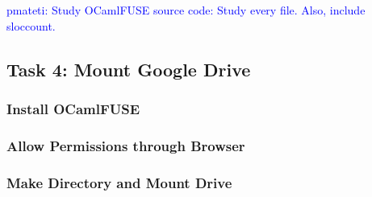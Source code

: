 \documentclass{article}
\newcommand{\PM}[1]{\textcolor{Blue}{pmateti: #1}}%
\begin{document}
\PM{Study OCamlFUSE source code: Study every file.  Also, include sloccount.}

\subsection{Task 4: Mount Google Drive}
\subsubsection{Install OCamlFUSE}
\subsubsection{Allow Permissions through Browser }
\subsubsection{Make Directory and Mount Drive}
\end{document}
